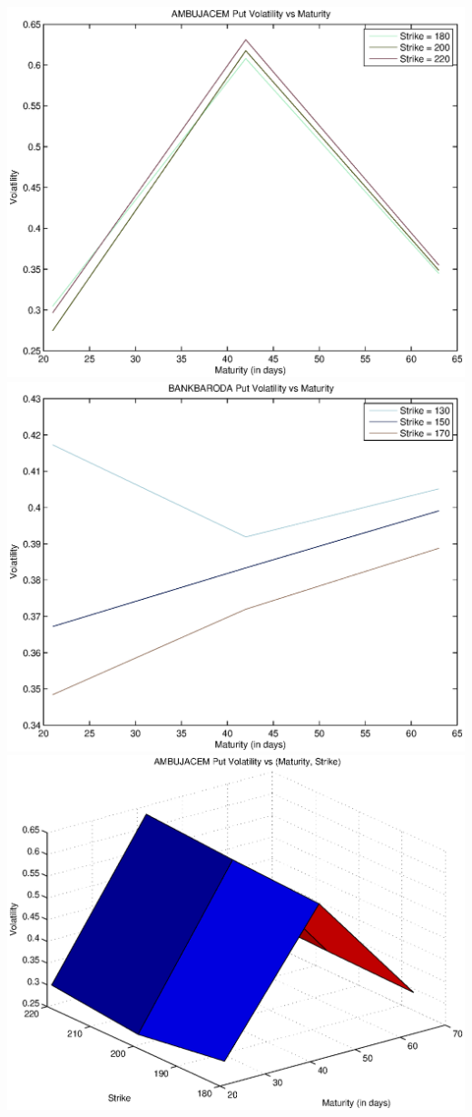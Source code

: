 \documentclass{article}
\begin{document}
\includegraphics[width=\textwidth]{AMBUJACEM_Put_Volatility_vs_Maturity} \\                
\includegraphics[width=\textwidth]{BANKBARODA_Put_Volatility_vs_Maturity} \\
\includegraphics[width=\textwidth]{AMBUJACEM_Put_Volatility_vs_(Maturity,_Strike)} \\      
\end{document}
